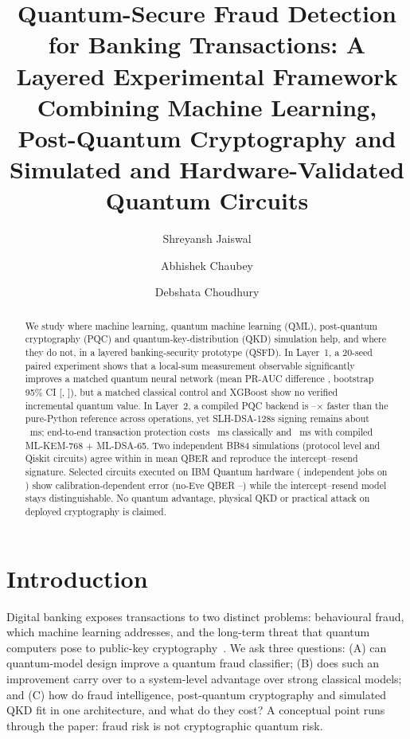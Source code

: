 \documentclass[runningheads]{llncs}
\begin{document}
\title{Quantum-Secure Fraud Detection for Banking Transactions: A Layered Experimental Framework Combining Machine Learning, Post-Quantum Cryptography and Simulated and Hardware-Validated Quantum Circuits}
\author{Shreyansh Jaiswal \and Abhishek Chaubey \and Debshata Choudhury}
\maketitle

\begin{abstract}
We study where machine learning, quantum machine learning (QML), post-quantum cryptography (PQC) and quantum-key-distribution (QKD) simulation help, and where they do not, in a layered banking-security prototype (QSFD). In Layer~1, a 20-seed paired experiment shows that a local-sum measurement observable significantly improves a matched quantum neural network (mean PR-AUC difference \LsDelta{}, bootstrap 95\% CI [\LsCIlo{}, \LsCIhi{}]), but a matched classical control and XGBoost show no verified incremental quantum value. In Layer~2, a compiled PQC backend is \SpeedupMin{}--\SpeedupMax{}$\times$ faster than the pure-Python reference across operations, yet SLH-DSA-128s signing remains about \OptSlhSSignMs{}~ms; end-to-end transaction protection costs \EEAMedian{}~ms classically and \EECMedian{}~ms with compiled ML-KEM-768 + ML-DSA-65. Two independent BB84 simulations (protocol level and Qiskit circuits) agree within \BbMaxDiff{} in mean QBER and reproduce the intercept--resend signature. Selected circuits executed on IBM Quantum hardware (\HwJobs{} independent jobs on \HwBackend{}) show calibration-dependent error (no-Eve QBER \HwNoEveBest{}--\HwNoEveWorse{}) while the intercept--resend model stays distinguishable. No quantum advantage, physical QKD or practical attack on deployed cryptography is claimed.
\end{abstract}

\section{Introduction}\label{sec:intro}
Digital banking exposes transactions to two distinct problems: behavioural fraud, which machine learning addresses, and the long-term threat that quantum computers pose to public-key cryptography~\cite{shor,mosca}. We ask three questions: (A) can quantum-model design improve a quantum fraud classifier; (B) does such an improvement carry over to a system-level advantage over strong classical models; and (C) how do fraud intelligence, post-quantum cryptography and simulated QKD fit in one architecture, and what do they cost? A conceptual point runs through the paper: fraud risk is not cryptographic quantum risk.
\end{document}
